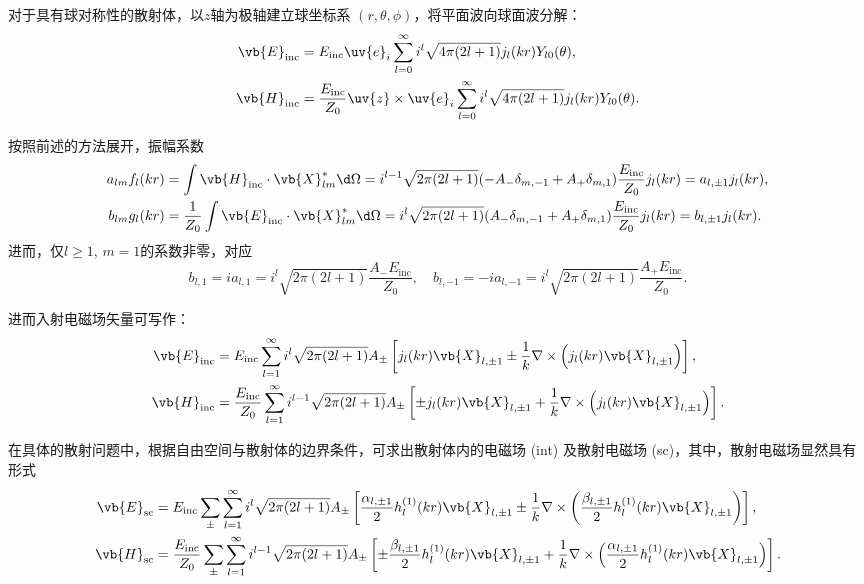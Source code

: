 对于具有球对称性的散射体，以\(z\)轴为极轴建立球坐标系 \((r,\theta,\phi)\)，将平面波向球面波分解：
\begin{align*}
	\vb{E}_{\text{inc}} & = E_{\text{inc}}\uv{e}_i\sum_{l=0}^{\infty}i^l\sqrt{4\pi(2l+1)}j_l(kr)Y_{l0}(\theta),                         \\
	\vb{H}_{\text{inc}} & = \frac{E_{\text{inc}}}{Z_0}\uv{z}\times\uv{e}_i\sum_{l=0}^{\infty}i^l\sqrt{4\pi(2l+1)}j_l(kr)Y_{l0}(\theta).
\end{align*}

按照前述的方法展开，振幅系数
\begin{align*}
	a_{lm}f_l(kr) & = \int\vb{H}_{\text{inc}}\cdot\vb{X}_{lm}^*\d \Omega = i^{l-1}\sqrt{2\pi(2l+1)}(-A_-\delta_{m,-1}+A_+\delta_{m,1})\frac{E_{\text{inc}}}{Z_0}j_l(kr) = a_{l,\pm1}j_l(kr),         \\
	b_{lm}g_l(kr) & = \frac{1}{Z_0}\int\vb{E}_{\text{inc}}\cdot\vb{X}_{lm}^*\d \Omega = i^l\sqrt{2\pi(2l+1)}(A_-\delta_{m,-1}+A_+\delta_{m,1})\frac{E_{\text{inc}}}{Z_0}j_l(kr) = b_{l,\pm1}j_l(kr).
\end{align*}
进而，仅\(l\geq1,\,m=1\)的系数非零，对应
\begin{equation*}
	b_{l,1}=ia_{l,1}=i^l\sqrt{2\pi(2l+1)}\frac{A_-E_{\text{inc}}}{Z_0},\quad b_{l,-1}=-ia_{l,-1}=i^l\sqrt{2\pi(2l+1)}\frac{A_+E_{\text{inc}}}{Z_0}.
\end{equation*}

进而入射电磁场矢量可写作：
\begin{align*}
	\vb{E}_{\text{inc}} & = E_{\text{inc}}\sum_{l=1}^{\infty}i^l\sqrt{2\pi(2l+1)}A_{\pm}\left[j_l(kr)\vb{X}_{l,\pm1}\pm\frac{1}{k}\nabla\times\left(j_l(kr)\vb{X}_{l,\pm1}\right)\right],                   \\
	\vb{H}_{\text{inc}} & = \frac{E_{\text{inc}}}{Z_0}\sum_{l=1}^{\infty}i^{l-1}\sqrt{2\pi(2l+1)}A_{\pm}\left[\pm j_l(kr)\vb{X}_{l,\pm1}+\frac{1}{k}\nabla\times\left(j_l(kr)\vb{X}_{l,\pm1}\right)\right].
\end{align*}

在具体的散射问题中，根据自由空间与散射体的边界条件，可求出散射体内的电磁场 (int) 及散射电磁场 (sc)，其中，散射电磁场显然具有形式
\begin{align*}
	\vb{E}_{\text{sc}} & = E_{\text{inc}}\sum_{\pm}\sum_{l=1}^{\infty}i^l\sqrt{2\pi(2l+1)}A_{\pm}\left[\frac{\alpha_{l,\pm1}}{2}h_l^{(1)}(kr)\vb{X}_{l,\pm1}\pm\frac{1}{k}\nabla\times\left(\frac{\beta_{l,\pm1}}{2}h_l^{(1)}(kr)\vb{X}_{l,\pm1}\right)\right],                  \\
	\vb{H}_{\text{sc}} & = \frac{E_{\text{inc}}}{Z_0}\sum_{\pm}\sum_{l=1}^{\infty}i^{l-1}\sqrt{2\pi(2l+1)}A_{\pm}\left[\pm\frac{\beta_{l,\pm1}}{2}h_l^{(1)}(kr)\vb{X}_{l,\pm1}+\frac{1}{k}\nabla\times\left(\frac{\alpha_{l,\pm1}}{2}h_l^{(1)}(kr)\vb{X}_{l,\pm1}\right)\right].
\end{align*}

